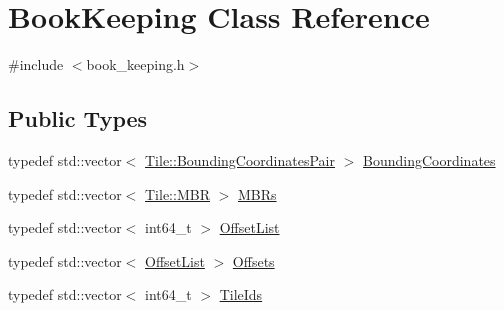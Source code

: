 \hypertarget{classBookKeeping}{}\section{Book\+Keeping Class Reference}
\label{classBookKeeping}


{\ttfamily \#include $<$book\+\_\+keeping.\+h$>$}

\subsection*{Public Types}
\begin{DoxyCompactItemize}
\item 
typedef std\+::vector$<$ \hyperlink{classTile_a7103069b7ba05d1032733e3a026b8632}{Tile\+::\+Bounding\+Coordinates\+Pair} $>$ \hyperlink{classBookKeeping_a1eea369202e1cf25c837fbf64a210c4e}{Bounding\+Coordinates}
\item 
typedef std\+::vector$<$ \hyperlink{classTile_a0b0f911c937d339ce110c18a2d015a4d}{Tile\+::\+M\+B\+R} $>$ \hyperlink{classBookKeeping_a3c3be3ebbeab5f23248df738f4d1c897}{M\+B\+Rs}
\item 
typedef std\+::vector$<$ int64\+\_\+t $>$ \hyperlink{classBookKeeping_a0abbce3d062de307549f04c8426203c7}{Offset\+List}
\item 
typedef std\+::vector$<$ \hyperlink{classBookKeeping_a0abbce3d062de307549f04c8426203c7}{Offset\+List} $>$ \hyperlink{classBookKeeping_ac6a1eb7b4c44fee25fda405547b666e1}{Offsets}
\item 
typedef std\+::vector$<$ int64\+\_\+t $>$ \hyperlink{classBookKeeping_aae405d90bdb11aabd768c4d49ac7f110}{Tile\+Ids}
\end{DoxyCompactItemize}
